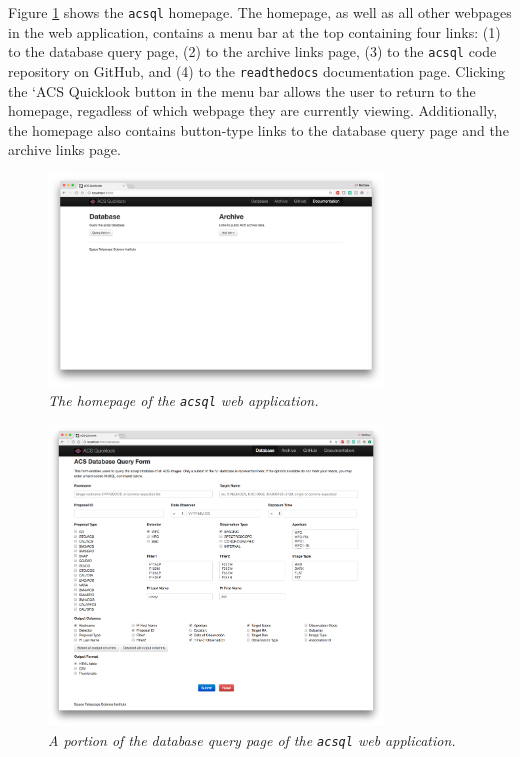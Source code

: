 \documentclass[10pt,journal,compsoc]{IEEEtran}
\begin{document}
Figure \ref{fig21} shows the \texttt{acsql} homepage.  The homepage, as well as all other webpages in the web application, contains a menu bar at the top containing four links:
(1) to the database query page, (2) to the archive links page, (3) to the \texttt{acsql} code repository on GitHub, and (4) to the \texttt{readthedocs} documentation page.  Clicking the
`ACS Quicklook button in the menu bar allows the user to return to the homepage, regadless of which webpage they are currently viewing.  Additionally, the homepage also contains button-type
links to the database query page and the archive links page.

\begin{figure}[!h]
\centering
\includegraphics[width=3.5in]{./figures/homepage.png}
\caption{\textit{The homepage of the \texttt{acsql} web application.}}
\label{fig21}
\end{figure}

\begin{figure}[!h]
\centering
\includegraphics[width=3.5in]{./figures/database_query_page.png}
\caption{\textit{A portion of the database query page of the \texttt{acsql} web application.}}
\label{fig22}
\end{figure}
\end{document}
